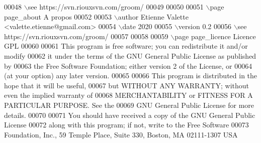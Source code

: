 \begin{DoxyCode}
00048 \(\backslash\)see https://svn.riouxsvn.com/groom/
00049 
00050 
00051 \(\backslash\)page page\_about A propos
00052 
00053 \(\backslash\)author Etienne Valette <valette.etienne@gmail.com>
00054 \(\backslash\)date 2020
00055 \(\backslash\)version 0.2
00056 \(\backslash\)see https://svn.riouxsvn.com/groom/
00057 
00058 
00059 \(\backslash\)page page\_licence Licence GPL
00060 
00061 This program is free software; you can redistribute it and/or modify
00062 it under the terms of the GNU General Public License as published by
00063 the Free Software Foundation; either version 2 of the License, or
00064 (at your option) any later version.
00065 
00066 This program is distributed in the hope that it will be useful,
00067 but WITHOUT ANY WARRANTY; without even the implied warranty of
00068 MERCHANTABILITY or FITNESS FOR A PARTICULAR PURPOSE. See the
00069 GNU General Public License for more details.
00070 
00071 You should have received a copy of the GNU General Public License
00072 along with this program; if not, write to the Free Software
00073 Foundation, Inc., 59 Temple Place, Suite 330, Boston, MA 02111-1307 USA
\end{DoxyCode}
